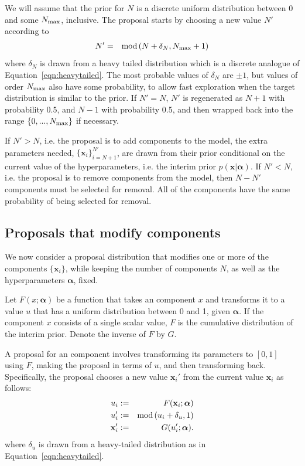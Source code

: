 \documentclass[letterpaper, 11pt]{article}
\newcommand{\hyperparams}{\boldsymbol{\alpha}}
\newcommand{\xx}{\mathbf{x}}
\begin{document}
We will assume that the prior for $N$ is a discrete uniform distribution
between 0 and some $N_{\rm max}$, inclusive. The proposal starts by choosing
a new value $N'$ according to
\begin{eqnarray}
N' &=& \textnormal{mod}\left(N + \delta_N, N_{\rm max} + 1\right)
\end{eqnarray}
where $\delta_N$ is drawn from a heavy tailed
distribution which is a discrete analogue of Equation~\ref{eqn:heavytailed}.
The most probable values of $\delta_N$ are $\pm 1$, but values
of order $N_{\rm max}$ also have some probability, to allow fast exploration
when the target distribution is similar to the prior. If $N' = N$, $N'$ is
regenerated as $N+1$ with probability 0.5, and $N-1$ with probability 0.5,
and then wrapped back into the range $\{0,...,N_{\rm max}\}$ if necessary.

If $N' > N$, i.e. the proposal is to add components to the model,
the extra parameters needed, $\{\xx_i\}_{i=N+1}^{N'}$,
are drawn from their prior conditional on the current value of the
hyperparameters, i.e. the interim prior $p(\xx | \hyperparams)$.
If $N' < N$, i.e. the proposal is to remove components from the model,
then $N - N'$ components must be selected for removal. All
of the components have the same probability of being selected for removal.

\subsection{Proposals that modify components}\label{sec:proposal2}
We now consider a proposal distribution that modifies one or more of the
components $\{\xx_i\}$, while keeping the number of components $N$, as well as the
hyperparameters $\hyperparams$, fixed.

Let $F(x; \hyperparams)$ be a function that takes an component $x$ and transforms it
to a value $u$ that has a uniform distribution between 0 and 1, given $\hyperparams$.
If the component $x$ consists of a single scalar value, $F$ is the cumulative
distribution of the interim prior. Denote the inverse of $F$ by $G$.

A proposal
for an component involves transforming its parameters to $[0, 1]$ using $F$,
making the proposal in terms of $u$, and then transforming back.
Specifically, the proposal chooses
a new value $\xx_i'$ from the current value $\xx_i$ as follows:
\begin{eqnarray}
u_i &:=& F(\xx_i; \hyperparams)\\
u_i' &:=& \textnormal{mod}\left(u_i + \delta_u, 1\right)\\
\xx_i' &:=& G(u_i'; \hyperparams).
\end{eqnarray}
where $\delta_u$ is drawn from a heavy-tailed distribution as in
Equation~\ref{eqn:heavytailed}.
\end{document}
